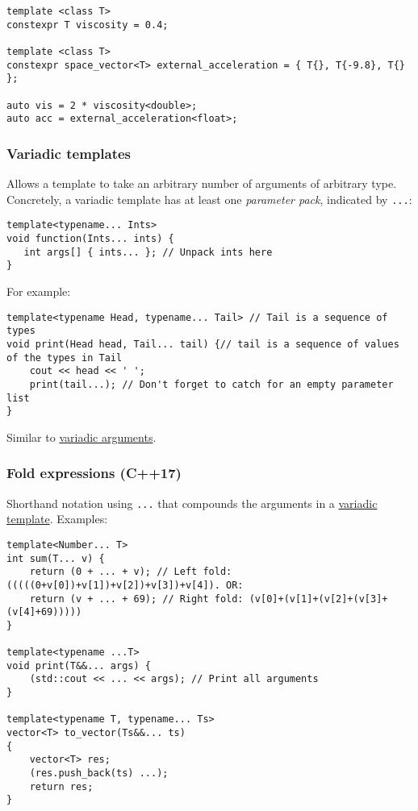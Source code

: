 \documentclass[8pt, table, xcdraw]{article}%
\begin{document}
\begin{lstlisting}
template <class T>
constexpr T viscosity = 0.4;

template <class T>
constexpr space_vector<T> external_acceleration = { T{}, T{-9.8}, T{} };

auto vis = 2 * viscosity<double>;
auto acc = external_acceleration<float>;
\end{lstlisting}

\subsubsection{Variadic templates} \label{variadictemplates}

Allows a template to take an arbitrary number of arguments of arbitrary type. Concretely, a variadic template has at least one \emph{parameter pack}, indicated by \lstinline{...}:

\begin{lstlisting}
template<typename... Ints>
void function(Ints... ints) {
   int args[] { ints... }; // Unpack ints here
}
\end{lstlisting}

For example:

\begin{lstlisting}
template<typename Head, typename... Tail> // Tail is a sequence of types
void print(Head head, Tail... tail) {// tail is a sequence of values of the types in Tail
    cout << head << ' ';
    print(tail...); // Don't forget to catch for an empty parameter list
}
\end{lstlisting}

Similar to \hyperref[variadicarguments]{variadic arguments}.

\subsubsection{Fold expressions (C++17)}

Shorthand notation using \lstinline{...} that compounds the arguments in a \hyperref[variadictemplates]{variadic template}. Examples:

\begin{lstlisting}
template<Number... T>
int sum(T... v) {
    return (0 + ... + v); // Left fold: (((((0+v[0])+v[1])+v[2])+v[3])+v[4]). OR:
    return (v + ... + 69); // Right fold: (v[0]+(v[1]+(v[2]+(v[3]+(v[4]+69)))))
}

template<typename ...T>
void print(T&&... args) {
    (std::cout << ... << args); // Print all arguments
}

template<typename T, typename... Ts>
vector<T> to_vector(Ts&&... ts)
{
    vector<T> res;
    (res.push_back(ts) ...);
    return res;
}
\end{lstlisting}
\end{document}
